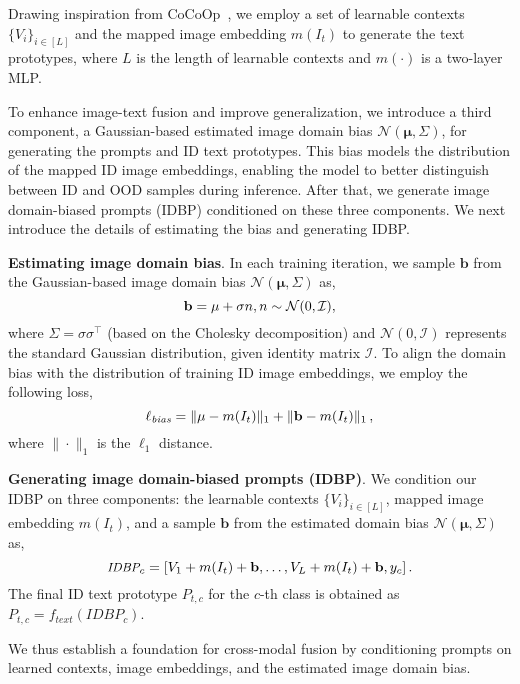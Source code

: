 Drawing inspiration from CoCoOp~\cite{zhou_learning_2022}, we employ a set of learnable contexts $\{V_i\}_{i \in [L]}$ and the mapped image embedding $m(I_t)$ to generate the text prototypes, where $L$ is the length of learnable contexts and $m(\cdot)$ is a two-layer MLP.

To enhance image-text fusion and improve generalization, we introduce a third component, a Gaussian-based estimated image domain bias $\mathcal{N}(\mathbf{\mu}, \Sigma)$, for generating the prompts and ID text prototypes.
This bias models the distribution of the mapped ID image embeddings, enabling the model to better distinguish between ID and OOD samples during inference. 
After that, we generate image domain-biased prompts (IDBP) conditioned on these three components. 
We next introduce the details of estimating the bias and generating IDBP.

\noindent 
\textbf{Estimating image domain bias}. 
In each training iteration, we sample $\mathbf{b}$ from the Gaussian-based image domain bias $\mathcal{N}(\mathbf{\mu}, \Sigma)$ as,
\begin{equation}
    \small
    \mathbf{b} = \mu + \sigma n, n\sim \mathcal{N}(0, \mathcal{I}),
\end{equation}
where $\Sigma = \sigma \sigma^\top$ (based on the Cholesky decomposition) and $\mathcal{N}(0, \mathcal{I})$ represents the standard Gaussian distribution, given identity matrix $\mathcal{I}$.
To align the domain bias with the distribution of training ID image embeddings, we employ the following loss,
\begin{equation}
\small
\label{loss: bias}
    \ell_{\textit{bias}} = \| \mu - m(I_t)\|_1 + \|\mathbf{b} - m(I_t)\|_1\,,
\end{equation}
where $\|\cdot\|_1$ is the $\ell_1$ distance.

\noindent 
\textbf{Generating image domain-biased prompts (IDBP)}. 
We condition our IDBP on three components: the learnable contexts $\{V_{i}\}_{i\in[L]}$, mapped image embedding $m(I_t)$, and a sample $\mathbf{b}$ from the estimated domain bias $\mathcal{N}(\mathbf{\mu}, \Sigma)$ as,
\begin{equation}
    \small
    \textit{IDBP}_c = [V_1 + m(I_t) + \mathbf{b}, \ldots, V_L + m(I_t) + \mathbf{b}, y_c]\,.
\end{equation}
The final ID text prototype $P_{t, c}$ for the $c$-th class is obtained as $P_{t, c} = f_{\textit{text}} (\textit{IDBP}_c)$.

We thus establish a foundation for cross-modal fusion by conditioning prompts on learned contexts, image embeddings, and the estimated image domain bias. 

